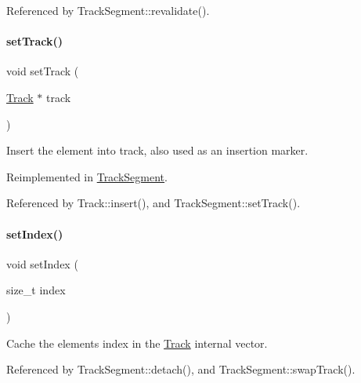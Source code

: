 Referenced by Track\+Segment\+::revalidate().

\mbox{\label{classKite_1_1TrackElement_abd3d8093f871d3d1a7f24b053648026c}} 
\paragraph{\texorpdfstring{set\+Track()}{setTrack()}}
{\footnotesize\ttfamily void set\+Track (\begin{DoxyParamCaption}\item[{\mbox{\hyperlink{classKite_1_1Track}{Track}} $\ast$}]{track }\end{DoxyParamCaption})\hspace{0.3cm}{\ttfamily [virtual]}}

Insert the element into {\ttfamily track}, also used as an insertion marker. 

Reimplemented in \mbox{\hyperlink{classKite_1_1TrackSegment_abd3d8093f871d3d1a7f24b053648026c}{Track\+Segment}}.



Referenced by Track\+::insert(), and Track\+Segment\+::set\+Track().

\mbox{\label{classKite_1_1TrackElement_abee236b4d62f51320212f31e010fc1b5}} 
\paragraph{\texorpdfstring{set\+Index()}{setIndex()}}
{\footnotesize\ttfamily void set\+Index (\begin{DoxyParamCaption}\item[{size\+\_\+t}]{index }\end{DoxyParamCaption})\hspace{0.3cm}{\ttfamily [inline]}}

Cache the element\textquotesingle{}s index in the \mbox{\hyperlink{classKite_1_1Track}{Track}} internal vector. 

Referenced by Track\+Segment\+::detach(), and Track\+Segment\+::swap\+Track().

\mbox{\label{classKite_1_1TrackElement_af5332d647c0482aa90ad7cc9b2a50f3a}} 
